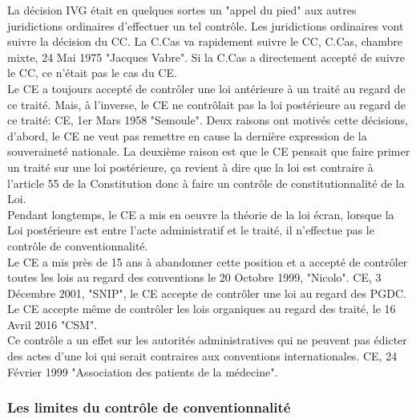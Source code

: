 \documentclass[10pt, a4paper, openany]{book}
\begin{document}
La décision IVG était en quelques sortes un "appel du pied" aux autres juridictions ordinaires d'effectuer un tel contrôle. Les juridictions ordinaires vont suivre la décision du CC. La C.Cas va rapidement suivre le CC, C.Cas, chambre mixte, 24 Mai 1975 "Jacques Vabre". Si la C.Cas a directement accepté de suivre le CC, ce n'était pas le cas du CE. \\
Le CE a toujours accepté de contrôler une loi antérieure à un traité au regard de ce traité. Mais, à l'inverse, le CE ne contrôlait pas la loi postérieure au regard de ce traité: CE, 1er Mars 1958 "Semoule". Deux raisons ont motivés cette décisions, d'abord, le CE ne veut pas remettre en cause la dernière expression de la souveraineté nationale. La deuxième raison est que le CE pensait que faire primer un traité sur une loi postérieure, ça revient à dire que la loi est contraire à l'article 55 de la Constitution donc à faire un contrôle de constitutionnalité de la Loi. \\
Pendant longtemps, le CE a mis en oeuvre la théorie de la loi écran, lorsque la Loi postérieure est entre l'acte administratif et le traité, il n'effectue pas le contrôle de conventionnalité. \\
Le CE a mis près de 15 ans à abandonner cette position et a accepté de contrôler toutes les lois au regard des conventions le 20 Octobre 1999, "Nicolo". CE, 3 Décembre 2001, "SNIP", le CE accepte de contrôler une loi au regard des PGDC. \\
Le CE accepte même de contrôler les lois organiques au regard des traité, le 16 Avril 2016 "CSM".  \\
Ce contrôle a un effet sur les autorités administratives qui ne peuvent pas édicter des actes d'une loi qui serait contraires aux conventions internationales. CE, 24 Février 1999 "Association des patients de la médecine".

\subsubsection{Les limites du contrôle de conventionnalité}
\end{document}
